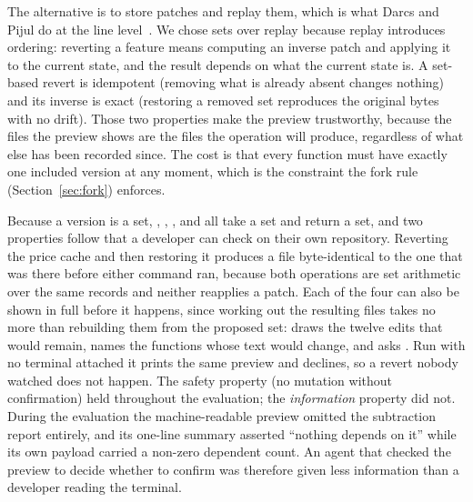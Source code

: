 The alternative is to store patches and replay them, which is what Darcs and Pijul
do at the line level~\cite{roundy2005,pijul2024}. We chose sets over replay
because replay introduces ordering: reverting a feature means computing an inverse
patch and applying it to the current state, and the result depends on what the
current state is. A set-based revert is idempotent (removing what is already absent
changes nothing) and its inverse is exact (restoring a removed set reproduces the
original bytes with no drift). Those two properties make the preview trustworthy,
because the files the preview shows are the files the operation will produce,
regardless of what else has been recorded since. The cost is that every function
must have exactly one included version at any moment, which is the constraint the
fork rule (Section~\ref{sec:fork}) enforces.

Because a version is a set, , , , and
 all take a set and return a set, and two properties follow that a
developer can check on their own repository. Reverting the price cache and then
restoring it produces a file byte-identical to the one that was there before either
command ran, because both operations are set arithmetic over the same records and
neither reapplies a patch. Each of the four can also be shown in full before it
happens, since working out the resulting files takes no more than rebuilding them
from the proposed set:  draws the twelve edits that
would remain, names the functions whose text would change, and asks
. Run with no terminal attached it prints the same
preview and declines, so a revert nobody watched does not happen. The safety
property (no mutation without confirmation) held throughout the evaluation; the
\emph{information} property did not. During the evaluation the machine-readable
preview omitted the subtraction report entirely, and its one-line summary asserted
``nothing depends on it'' while its own payload carried a non-zero dependent
count. An agent that checked the preview to decide whether to confirm was
therefore given less information than a developer reading the terminal.

